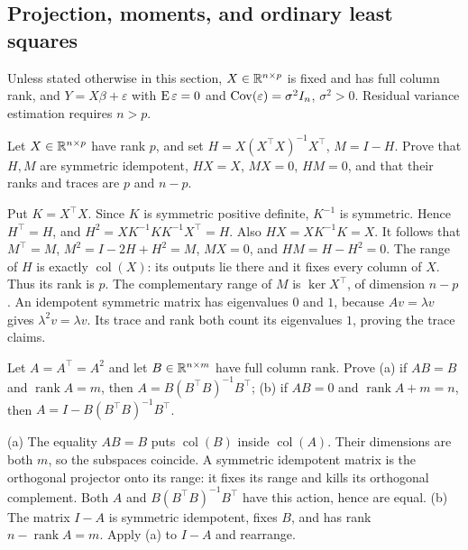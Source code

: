 \subsection*{Projection, moments, and ordinary least squares}
Unless stated otherwise in this section, $X\in\mathbb R^{n\times p}$ is fixed
and has full column rank, and $Y=X\beta+\varepsilon$ with
$\operatorname{E}\varepsilon=0$ and $\operatorname{Cov}(\varepsilon)=\sigma^2 I_n$, $\sigma^2>0$.
Residual variance estimation requires $n>p$.
\begin{problem}\label{ex:11:residual-projector}
Let $X\in\mathbb R^{n\times p}$ have rank $p$, and set
$H=X(X^\top X)^{-1}X^\top$, $M=I-H$.
Prove that $H,M$ are symmetric idempotent, $HX=X$, $MX=0$, $HM=0$,
and that their ranks and traces are $p$ and $n-p$.
\end{problem}
\begin{solution}
Put $K=X^\top X$. Since $K$ is symmetric positive definite, $K^{-1}$
is symmetric. Hence $H^\top=H$, and
$H^2=XK^{-1}KK^{-1}X^\top=H$. Also $HX=XK^{-1}K=X$.
It follows that $M^\top=M$, $M^2=I-2H+H^2=M$, $MX=0$,
and $HM=H-H^2=0$. The range of $H$ is exactly $\operatorname{col}(X)$:
its outputs lie there and it fixes every column of $X$. Thus its rank
is $p$. The complementary range of $M$ is $\ker X^\top$, of dimension
$n-p$. An idempotent symmetric matrix has eigenvalues $0$ and $1$,
because $Av=\lambda v$ gives $\lambda^2v=\lambda v$.
Its trace and rank both count its eigenvalues $1$, proving the trace claims.
\end{solution}

\begin{problem}
Let $A=A^\top=A^2$ and let $B\in\mathbb R^{n\times m}$ have full column rank.
Prove (a) if $AB=B$ and $\operatorname{rank}A=m$, then
$A=B(B^\top B)^{-1}B^\top$; (b) if $AB=0$ and
$\operatorname{rank}A+m=n$, then $A=I-B(B^\top B)^{-1}B^\top$.
\end{problem}
\begin{solution}
(a) The equality $AB=B$ puts $\operatorname{col}(B)$ inside
$\operatorname{col}(A)$. Their dimensions are both $m$, so the subspaces
coincide. A symmetric idempotent matrix is the orthogonal projector onto
its range: it fixes its range and kills its orthogonal complement.
Both $A$ and $B(B^\top B)^{-1}B^\top$ have this action, hence are equal.
(b) The matrix $I-A$ is symmetric idempotent, fixes $B$, and has rank
$n-\operatorname{rank}A=m$. Apply (a) to $I-A$ and rearrange.
\end{solution}

